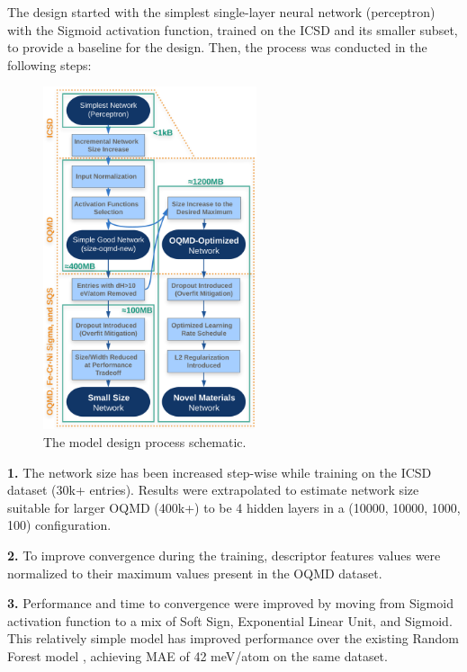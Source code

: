 The design started with the simplest single-layer neural network (perceptron) with the Sigmoid activation function, trained on the ICSD and its smaller subset, to provide a baseline for the design. Then, the process was conducted in the following steps:

    \begin{figure}
    \vspace{-12pt}
    \centering
    \includegraphics[width=0.56\textwidth]{sipfenn/SIPFENN_design_updated.png}
    \caption{The model design process schematic.}
    \label{sipfenn:fig:designprocess}
    \vspace{-18pt}
    \end{figure}

\textbf{1. }The network size has been increased step-wise while training on the ICSD dataset (30k+ entries). Results were extrapolated to estimate network size suitable for larger OQMD (400k+) to be 4 hidden layers in a (10000, 10000, 1000, 100) configuration.

\textbf{2. }To improve convergence during the training, descriptor features values were normalized to their maximum values present in the OQMD dataset.

\textbf{3. }Performance and time to convergence were improved by moving from Sigmoid activation function to a mix of Soft Sign, Exponential Linear Unit, and Sigmoid. This relatively simple model has improved performance over the existing Random Forest model \cite{Ward2017IncludingTessellations}, achieving MAE of 42 meV/atom on the same dataset.

